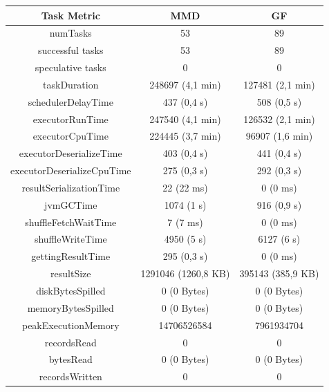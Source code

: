 \documentclass[a4paper,11pt, twoside]{article}
\begin{document}
            \begin{table}[h!]
                    \centering
                \small
                \begin{tabular}{ccc}
                    \toprule
                        \textbf{Task Metric} & \textbf{MMD} & \textbf{GF} \\
                    \midrule
                        numTasks & 53 & 89 \\
                        successful tasks & 53 & 89 \\
                        speculative tasks & 0 & 0 \\
                        taskDuration & 248697 (4,1 min) & 127481 (2,1 min) \\
                        schedulerDelayTime & 437 (0,4 s) & 508 (0,5 s) \\
                        executorRunTime & 247540 (4,1 min) & 126532 (2,1 min) \\
                        executorCpuTime & 224445 (3,7 min) & 96907 (1,6 min) \\
                        executorDeserializeTime & 403 (0,4 s) & 441 (0,4 s) \\
                        executorDeserializeCpuTime & 275 (0,3 s) & 292 (0,3 s) \\
                        resultSerializationTime & 22 (22 ms) & 0 (0 ms) \\
                        jvmGCTime & 1074 (1 s) & 916 (0,9 s) \\
                        shuffleFetchWaitTime & 7 (7 ms) & 0 (0 ms) \\
                        shuffleWriteTime & 4950 (5 s) & 6127 (6 s) \\
                        gettingResultTime & 295 (0,3 s) & 0 (0 ms) \\
                        resultSize & 1291046 (1260,8 KB) & 395143 (385,9 KB) \\
                        diskBytesSpilled & 0 (0 Bytes) & 0 (0 Bytes) \\
                        memoryBytesSpilled & 0 (0 Bytes) & 0 (0 Bytes) \\
                        peakExecutionMemory & 14706526584 & 7961934704 \\
                        recordsRead & 0 & 0 \\
                        bytesRead & 0 (0 Bytes) & 0 (0 Bytes) \\
                        recordsWritten & 0 & 0 \\

\end{tabular}
\end{table}
\end{document}
